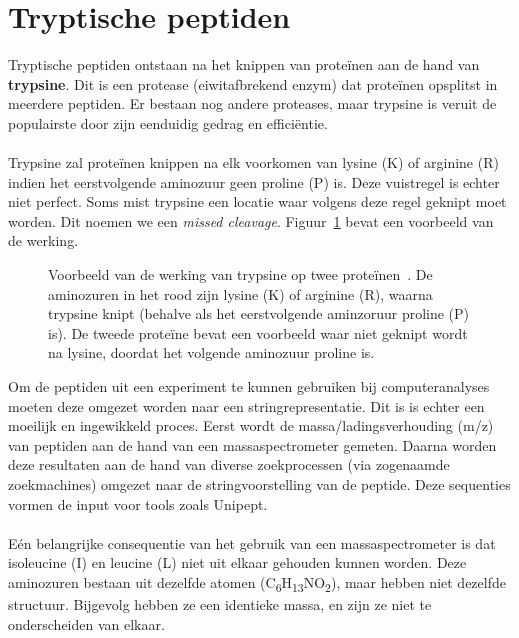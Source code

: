 \section{Tryptische peptiden}\label{sec:tryptische-peptiden}
Tryptische peptiden ontstaan na het knippen van proteïnen aan de hand van \textbf{trypsine}.
Dit is een protease (eiwitafbrekend enzym) dat proteïnen opsplitst in meerdere peptiden.
Er bestaan nog andere proteases, maar trypsine is veruit de populairste door zijn eenduidig gedrag en efficiëntie.
\\ \\
Trypsine zal proteïnen knippen na elk voorkomen van lysine (K) of arginine (R) indien het eerstvolgende aminozuur geen proline (P) is.
Deze vuistregel is echter niet perfect.
Soms mist trypsine een locatie waar volgens deze regel geknipt moet worden.
Dit noemen we een \textit{missed cleavage}.
Figuur~\ref{fig:trypsine} bevat een voorbeeld van de werking.

\begin{figure}[H]
    \centering
    
    \caption{Voorbeeld van de werking van trypsine op twee proteïnen~\cite{phdPieterUnipept}. De aminozuren in het rood zijn lysine (K) of arginine (R), waarna trypsine knipt (behalve als het eerstvolgende aminzoruur proline (P) is). De tweede proteïne bevat een voorbeeld waar niet geknipt wordt na lysine, doordat het volgende aminozuur proline is.}
    \label{fig:trypsine}
\end{figure}

Om de peptiden uit een experiment te kunnen gebruiken bij computeranalyses moeten deze omgezet worden naar een stringrepresentatie.
Dit is is echter een moeilijk en ingewikkeld proces.
Eerst wordt de massa/ladingsverhouding (m/z) van peptiden aan de hand van een massaspectrometer gemeten.
Daarna worden deze resultaten aan de hand van diverse zoekprocessen (via zogenaamde zoekmachines) omgezet naar de stringvoorstelling van de peptide.
Deze sequenties vormen de input voor tools zoals Unipept.
\\ \\
Eén belangrijke consequentie van het gebruik van een massaspectrometer is dat isoleucine (I) en leucine (L) niet uit elkaar gehouden kunnen worden.
Deze aminozuren bestaan uit dezelfde atomen (C\textsubscript{6}H\textsubscript{13}NO\textsubscript{2}), maar hebben niet dezelfde structuur.
Bijgevolg hebben ze een identieke massa, en zijn ze niet te onderscheiden van elkaar.


